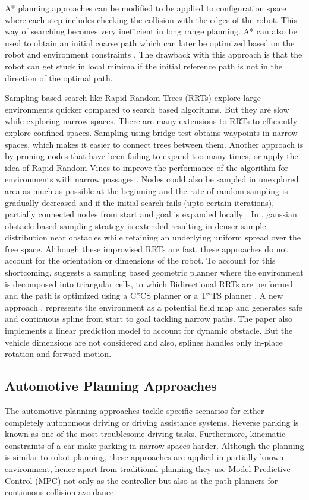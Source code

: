 \documentclass[rnd]{mas_proposal}
\begin{document}
A* planning approaches \cite{6876211} \cite{6968200} can be modified to be applied to configuration space where each step includes checking the collision with the edges of the robot. This way of searching becomes very inefficient in long range planning. A* can also be used to obtain an initial coarse path which can later be optimized based on the robot and environment constraints \cite{9632369} \cite{8743249} \cite{8484297}. The drawback with this approach is that the robot can get stuck in local minima if the initial reference path is not in the direction of the optimal path.

Sampling based search like Rapid Random Trees (RRTs) explore large environments quicker compared to search based algorithms. But they are slow while exploring narrow spaces. There are many extensions to RRTs to efficiently explore confined spaces. Sampling using bridge test \cite{8961757} obtains waypoints in narrow spaces, which makes it easier to connect trees between them. Another approach is by pruning nodes that have been failing to expand too many times, or apply the idea of Rapid Random Vines to improve the performance of the algorithm for environments with narrow passages \cite{9561207}. Nodes could also be sampled in unexplored area as much as possible at the beginning and the rate of random sampling is gradually decreased and if the initial search fails (upto certain iterations), partially connected nodes from start and goal is expanded locally \cite{9536671}. In \cite{8324439}, gaussian obstacle-based sampling strategy is extended resulting in denser sample distribution near obstacles while retaining an underlying uniform spread over the free space. Although these improvised RRTs are fast, these approaches do not account for the orientation or dimensions of the robot. To account for this shortcoming, \cite{7061856} suggests a sampling based geometric planner where the environment is decomposed into triangular cells, to which Bidirectional RRTs are performed and the path is optimized using a C*CS planner or a T*TS planner \cite{7880346}. 
A new approach \cite{8022960}, represents the environment as a potential field map and generates safe and continuous spline from start to goal tackling narrow paths. The paper also implements a linear prediction model to account for dynamic obstacle. But the vehicle dimensions are not considered and also, splines handles only in-place rotation and forward motion.

\subsection{Automotive Planning Approaches}
The automotive planning approaches tackle specific scenarios for either completely autonomous driving or driving assistance systems. Reverse parking is known as one of the most troublesome driving tasks. Furthermore, kinematic constraints of a car make parking in narrow spaces harder. Although the planning is similar to robot planning, these approaches are applied in partially known environment, hence apart from traditional planning they use Model Predictive Control (MPC) not only as the controller but also as the path planners for continuous collision avoidance.
\end{document}
